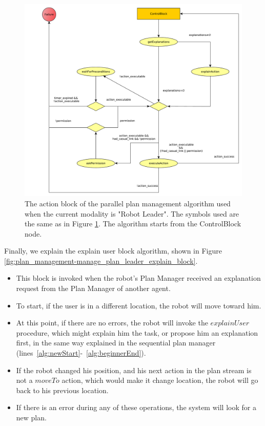 \begin{figure}[ht!]
 \centering
 \includegraphics[]{img/plan_management/manage_plan_leader_action_block.pdf}
 \caption{The action block of the parallel plan management algorithm used when the current modality is "Robot Leader". The symbols used are the same as in Figure \ref{fig:plan_management-manage_plan_leader_control_block}. The algorithm starts from the ControlBlock node.}
 \label{fig:plan_management-manage_plan_leader_control_block}
 \end{figure}


Finally, we explain the explain user block algorithm, shown in Figure \ref{fig:plan_management-manage_plan_leader_explain_block}.
\begin{itemize}
\item This block is invoked when the robot's Plan Manager received an explanation request from the Plan Manager of another agent.
\item To start, if the user is in a different location, the robot will move toward him.
\item At this point, if there are no errors, the robot will invoke the $explainUser$ procedure, which might explain him the task, or propose him an explanation first, in the same way explained in the sequential plan manager (lines~\ref{alg:newStart}-~\ref{alg:beginnerEnd}). 
\item If the robot changed his position, and his next action in the plan stream is not a $moveTo$ action, which would make it change location, the robot will go back to his previous location.
\item If there is an error during any of these operations, the system will look for a new plan.
\end{itemize}


